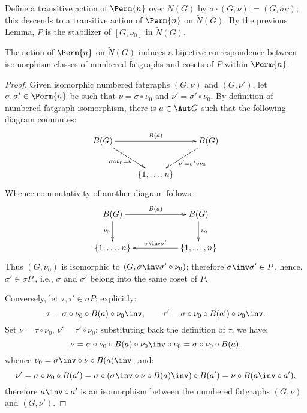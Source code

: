 Define a transitive action of $\Perm{n}$ over $N(G)$ by $\sigma \cdot
(G,\nu) := (G, \sigma\nu)$; this descends to a transitive action of
$\Perm{n}$ on $\tilde N(G)$.  By the previous Lemma, $P$ is the
stabilizer of $[G, \nu_0]$ in $\tilde N(G)$.
\begin{lemma}\label{lemma:numberings}
  The action of $\Perm{n}$ on $\tilde N(G)$ induces a bijective
  correspondence between isomorphism classes of numbered fatgraphs and
  cosets of $P$ within $\Perm{n}$.
\end{lemma}
\begin{proof}
  Given isomorphic numbered fatgraphs $(G,\nu)$ and $(G,\nu')$, let
  $\sigma, \sigma' \in \Perm{n}$ be such that $\nu = \sigma \circ
  \nu_0$ and $\nu' = \sigma' \circ \nu_0$.  By definition of numbered
  fatgraph isomorphism, there is $a \in \Aut G$ such that the
  following diagram commutes:
  \begin{equation*}
    \xymatrix{
      \Holes{G} & & \Holes{G} \\
      & \{1, \ldots, n\} &
      \ar^{\Holes{a}} "1,1";"1,3"
      \ar_{\sigma\circ\nu_0 = \nu} "1,1";"2,2"
      \ar^{\nu' = \sigma' \circ \nu_0} "1,3";"2,2"
      }
  \end{equation*}
  Whence commutativity of another diagram follows:
  \begin{equation*}
    \xymatrix{
      \Holes{G} &&  \Holes{G} \\
      \{1,\ldots,n\} && \{1,\ldots,n\}
      \ar^{\Holes{a}} "1,1";"1,3"
      \ar_{\nu_0} "1,1";"2,1"
      \ar^{\nu_0} "1,3";"2,3"
      \ar_{\sigma\inv \sigma'} "2,3";"2,1"
    }
  \end{equation*}
  Thus $(G, \nu_0)$ is isomorphic to $(G, \sigma\inv \sigma' \circ
  \nu_0)$; therefore $\sigma\inv \sigma' \in P$, hence, $\sigma' \in
  \sigma P$., i.e., $\sigma$ and $\sigma'$ belong into the same coset
  of $P$.
  
  Conversely, let $\tau, \tau' \in \sigma P$; explicitly:
  \begin{equation*}
    \tau = \sigma \circ \nu_0 \circ \Holes{a} \circ \nu_0\inv,
    \qquad
    \tau' = \sigma \circ \nu_0 \circ \Holes{a'} \circ \nu_0\inv.
  \end{equation*}
  Set $\nu = \tau \circ \nu_0$, $\nu' = \tau' \circ \nu_0$;
  substituting back the definition of $\tau$, we have:
  \begin{equation*}
    \nu =  \sigma \circ \nu_0 \circ \Holes{a} \circ \nu_0\inv \circ \nu_0 
        =  \sigma \circ \nu_0 \circ \Holes{a},
  \end{equation*}
  whence $\nu_0 = \sigma\inv \circ \nu \circ \Holes{a}\inv$, and:
  \begin{equation*}
    \nu' = \sigma \circ \nu_0 \circ \Holes{a'}
    = \sigma \circ \left( \sigma\inv \circ \nu \circ B(a)\inv \right) \circ \Holes{a'}
    = \nu \circ \Holes{a\inv \circ a'},
  \end{equation*}
  therefore $a\inv \circ a'$ is an isomorphism between the numbered
  fatgraphs $(G,\nu)$ and $(G,\nu')$.
\end{proof}

